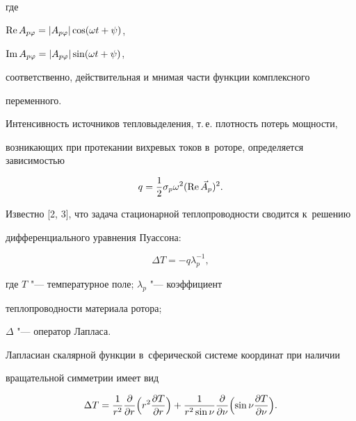 где

${\rm Re\,}A_{p\varphi } =\left| {A_{p\varphi } } \right|\cos (\omega t+\psi)$,

${\rm Im\,}A_{p\varphi } =\left| {A_{p\varphi } } \right|\sin (\omega t+\psi )$,

соответственно, действительная и мнимая части функции комплексного

переменного.



Интенсивность источников тепловыделения, т.\,е. плотность потерь мощности,

возникающих при протекании вихревых токов в~роторе, определяется зависимостью

\begin{equation}

\label{luta:eq4}

q=\frac12 \sigma _p \omega ^2({\rm Re\,}\vec {A}_p )^2.

\end{equation}



Известно [2, 3], что задача стационарной теплопроводности сводится к~решению

дифференциального уравнения Пуассона:

\begin{equation}

\label{luta:eq5}

\Delta T=-q\lambda _p^{-1} ,

\end{equation}

где $T$ "--- температурное поле; $\lambda _p$ "--- коэффициент

теплопроводности материала ротора;

$\Delta $ "--- оператор Лапласа.



Лапласиан скалярной функции в~сферической системе координат при наличии

вращательной симметрии имеет вид

\begin{equation}

\label{luta:eq6}

\Delta T=\frac1{r^2}\frac\partial {\partial r}

\Bigl( r^2\frac{\partial T}{\partial r} \Bigr)+

\frac 1{r^2\sin \nu }\frac \partial {\partial \nu }

\Bigl( \sin \nu \frac{\partial T}{\partial \nu } \Bigr).

\end{equation}



